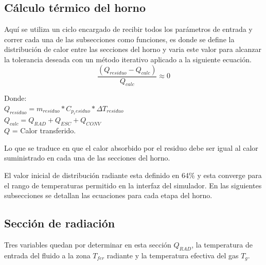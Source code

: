 \subsection{Cálculo térmico del horno}
\par Aquí se utiliza un ciclo encargado de recibir todos los parámetros de entrada y correr cada una de las subsecciones como funciones, es donde se define la distribución de calor entre las secciones del horno y varia este valor para alcanzar la tolerancia deseada con un método iterativo aplicado a la siguiente ecuación.
\begin{equation}
\label{eq:ciclo_externo}
\frac{(Q_{residuo} - Q_{calc})}{Q_{calc}} \approx 0
\end{equation}
\par Donde:\\
$Q_{residuo} = m_{residuo} * C_{p_residuo} * {\Delta}T_{residuo}$ \\
$Q_{calc} = Q_{RAD} + Q_{ESC} + Q_{CONV}$ \\
$Q$ = Calor transferido. \\

\par Lo que se traduce en que el calor absorbido por el residuo debe ser igual al calor suministrado en cada una de las secciones del horno.
\par El valor inicial de distribución radiante esta definido en 64\% y esta converge para el rango de temperaturas permitido en la interfaz del simulador. En las siguientes subsecciones se detallan las ecuaciones para cada etapa del horno.

\subsection{Sección de radiación}
\par Tres variables quedan por determinar en esta sección $Q_{RAD}$, la temperatura de entrada del fluido a la zona $T_{fer}$ radiante y la temperatura efectiva del gas $T_g$.

